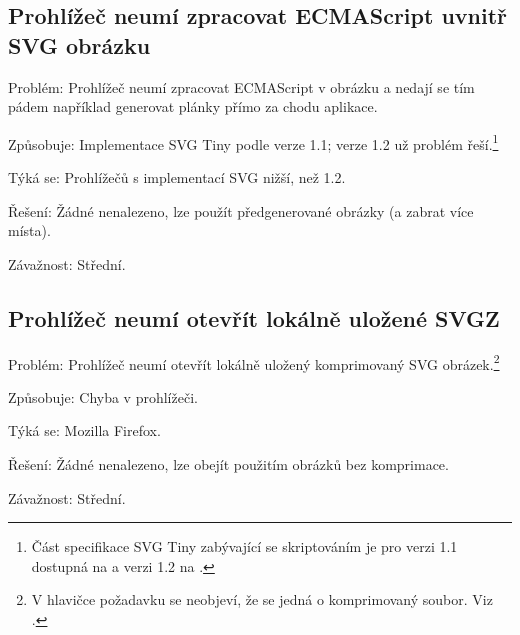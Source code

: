 \subsection{Prohlížeč neumí zpracovat ECMAScript uvnitř SVG obrázku}
\begin{description*}
\item[Problém:] Prohlížeč neumí zpracovat ECMAScript v obrázku a nedají se tím pádem například generovat plánky přímo za chodu aplikace.
\item[Způsobuje:] Implementace SVG Tiny podle verze 1.1; verze 1.2 už problém řeší.\footnote{Část specifikace SVG Tiny zabývající se skriptováním je pro verzi 1.1 dostupná na \cite[\texttt{/\#sec-scripting}]{SvgTiny11Doc} a verzi 1.2 na \cite[\texttt{/script.html}]{SvgTiny12Doc}.}
\item[Týká se:] Prohlížečů s implementací SVG nižší, než 1.2.
\item[Řešení:] Žádné nenalezeno, lze použít předgenerované obrázky (a zabrat více místa).
\item[Závažnost:] Střední.
\end{description*}

\subsection{Prohlížeč neumí otevřít lokálně uložené SVGZ}
\begin{description*}
\item[Problém:] Prohlížeč neumí otevřít lokálně uložený komprimovaný SVG obrázek.\footnote{V hlavičce požadavku se neobjeví, že se jedná o komprimovaný soubor. Viz \cite{SvgzFirefox}.}
\item[Způsobuje:] Chyba v prohlížeči.
\item[Týká se:] Mozilla Firefox.
\item[Řešení:] Žádné nenalezeno, lze obejít použitím obrázků bez komprimace.
\item[Závažnost:] Střední.
\end{description*}
